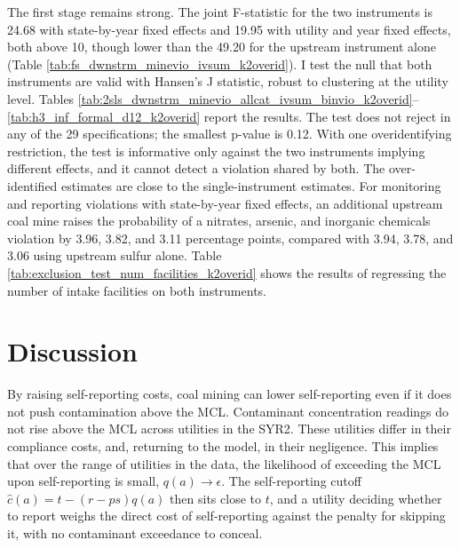 \documentclass[12pt]{article}
\begin{document}
The first stage remains strong. The joint F-statistic for the two instruments is 24.68 with state-by-year fixed effects and 19.95 with utility and year fixed effects, both above 10, though lower than the 49.20 for the upstream instrument alone (Table \ref{tab:fs_dwnstrm_minevio_ivsum_k2overid}). I test the null that both instruments are valid with Hansen's J statistic, robust to clustering at the utility level. Tables \ref{tab:2sls_dwnstrm_minevio_allcat_ivsum_binvio_k2overid}--\ref{tab:h3_inf_formal_d12_k2overid} report the results. The test does not reject in any of the 29 specifications; the smallest p-value is 0.12. With one overidentifying restriction, the test is informative only against the two instruments implying different effects, and it cannot detect a violation shared by both. The over-identified estimates are close to the single-instrument estimates. For monitoring and reporting violations with state-by-year fixed effects, an additional upstream coal mine raises the probability of a nitrates, arsenic, and inorganic chemicals violation by 3.96, 3.82, and 3.11 percentage points, compared with 3.94, 3.78, and 3.06 using upstream sulfur alone. Table \ref{tab:exclusion_test_num_facilities_k2overid} shows the results of regressing the number of intake facilities on both instruments.

\section{Discussion}\label{sec:discussion}

By raising self-reporting costs, coal mining can lower self-reporting even if it does not push contamination above the MCL. Contaminant concentration readings do not rise above the MCL across utilities in the SYR2. These utilities differ in their compliance costs, and, returning to the model, in their negligence. This implies that over the range of utilities in the data, the likelihood of exceeding the MCL upon self-reporting is small, $q(a) \rightarrow \epsilon$. The self-reporting cutoff $\hat{c}(a) = t - (r-ps)q(a)$ then sits close to $t$, and a utility deciding whether to report weighs the direct cost of self-reporting against the penalty for skipping it, with no contaminant exceedance to conceal.
 
\end{document}
